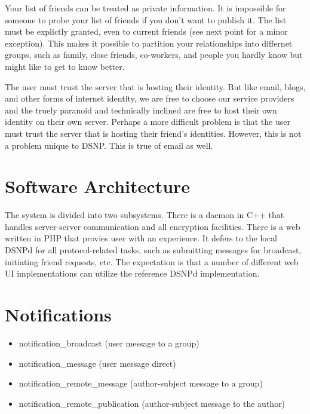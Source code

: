 \documentclass[letterpaper,11pt,oneside]{article}
\begin{document}
Your list of friends can be treated as private information. It is impossible
for someone to probe your list of friends if you don't want to publish it. The
list must be explictly granted, even to current friends (see next point for a
minor exception). This makes it possible to partition your relationships into
differnet groups, such as family, close friends, co-workers, and people you
hardly know but might like to get to know better.

The user must trust the server that is hosting their identity. But like email,
blogs, and other forms of internet identity, we are free to choose our service
providers and the truely paranoid and technically inclined are free to host
their own identity on their own server. Perhaps a more difficult problem is
that the user must trust the server that is hosting their friend's identities.
However, this is not a problem unique to DSNP. This is true of email as well.

\section{Software Architecture}

The system is divided into two subsystems. There is a daemon in C++ that
handles server-server communication and all encryption facilities. There is a
web written in PHP that provies user with an experience. It defers to the local
DSNPd for all protocol-related tasks, such as submitting messages for
broadcast, initiating friend requests, etc. The expectation is that a number of
different web UI implementations can utilize the reference DSNPd
implementation.

\section{Notifications}

\begin{itemize}
\item notification\_broadcast           (user message to a group)
\item notification\_message             (user message direct)
\item notification\_remote\_message     (author-subject message to a group)
\item notification\_remote\_publication (author-subject message to the author)
\end{itemize}
\end{document}
